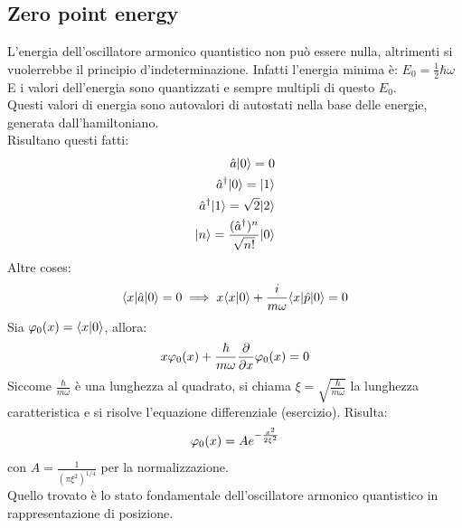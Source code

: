 \subsection{Zero point energy}
L'energia dell'oscillatore armonico quantistico non può essere nulla, altrimenti si vuolerrebbe il principio d'indeterminazione. Infatti l'energia minima è:
\(
    E_0 = \frac{1}{2} \hbar \omega
\)
E i valori dell'energia sono quantizzati e sempre multipli di questo $E_0$. \\
Questi valori di energia sono autovalori di autostati nella base delle energie, generata dall'hamiltoniano. \\
Risultano questi fatti:
\begin{align*}
    \hat a |0\ket = 0 \\
    \hat a^\dag |0\ket = |1\ket \\
    \hat a^\dag |1\ket = \sqrt{2} |2\ket \\
    |n\ket = \frac{(\hat a^\dag)^n}{\sqrt{n!}} |0\ket \\
\end{align*}
Altre coses:
\[
    \bra x | \hat a | 0 \ket = 0 \implies x \bra x | 0 \ket + \frac{i}{m\omega} \bra x | \hat p | 0 \ket = 0
\]
Sia $\vphi_0(x) = \bra x | 0 \ket$, allora:
\[
    x \vphi_0(x) + \frac{\hbar}{m \omega} \deriv[x]{} \vphi_0(x) = 0
\]
Siccome $\frac{\hbar}{m \omega}$ è una lunghezza al quadrato, si chiama $\xi = \sqrt{\frac{\hbar}{m \omega}}$ la lunghezza caratteristica e si risolve l'equazione differenziale (esercizio). Risulta:
\[
    \vphi_0(x) = A e^{-\frac{x^2}{2 \xi^2}}
\]
con $A = \frac{1}{(\pi \xi^2)^{1/4}}$ per la normalizzazione. \\
Quello trovato è lo stato fondamentale dell'oscillatore armonico quantistico in rappresentazione di posizione.

\begin{center}
\end{center}

